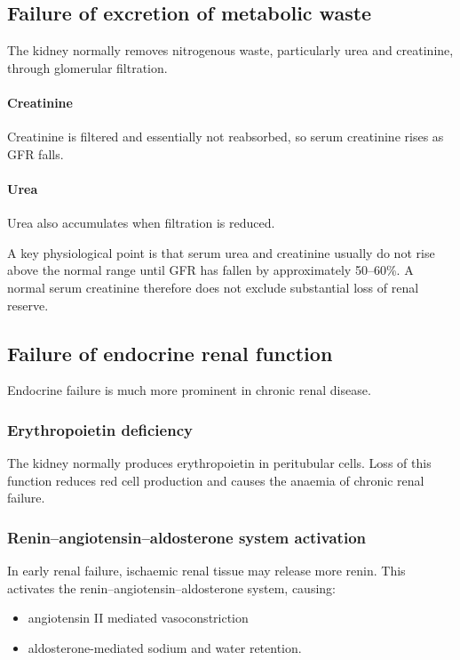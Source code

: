 \documentclass[11pt,a4paper]{article}
\begin{document}
\subsection{Failure of excretion of metabolic waste}

The kidney normally removes nitrogenous waste, particularly urea and creatinine, through glomerular filtration.

\paragraph{Creatinine}
Creatinine is filtered and essentially not reabsorbed, so serum creatinine rises as GFR falls.

\paragraph{Urea}
Urea also accumulates when filtration is reduced.

A key physiological point is that serum urea and creatinine usually do not rise above the normal range until GFR has fallen by approximately 50--60\%. A normal serum creatinine therefore does not exclude substantial loss of renal reserve.\cite{KamPowerRenalFailure}

\subsection{Failure of endocrine renal function}

Endocrine failure is much more prominent in chronic renal disease.

\subsubsection{Erythropoietin deficiency}

The kidney normally produces erythropoietin in peritubular cells. Loss of this function reduces red cell production and causes the anaemia of chronic renal failure.\cite{KamPowerRenalFailure}

\subsubsection{Renin--angiotensin--aldosterone system activation}

In early renal failure, ischaemic renal tissue may release more renin. This activates the renin--angiotensin--aldosterone system, causing:
\begin{itemize}
  \item angiotensin II mediated vasoconstriction
  \item aldosterone-mediated sodium and water retention.
\end{itemize}
\end{document}
